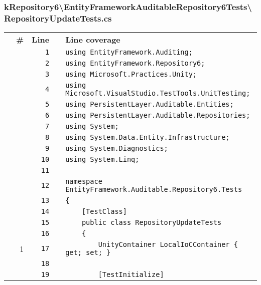 \documentclass[a4paper,10pt]{article}
\begin{document}
\subsubsection{kRepository6\textbackslash EntityFrameworkAuditableRepository6Tests\textbackslash RepositoryUpdateTests.cs}
\begin{longtable}[l]{lrrll}
\textbf{} & \textbf{\#} & \textbf{Line} & \textbf{} & \textbf{Line coverage}\\
\cellcolor{gray} &  & \verb~1~ & & \verb~using EntityFramework.Auditing;~\\
\cellcolor{gray} &  & \verb~2~ & & \verb~using EntityFramework.Repository6;~\\
\cellcolor{gray} &  & \verb~3~ & & \verb~using Microsoft.Practices.Unity;~\\
\cellcolor{gray} &  & \verb~4~ & & \verb~using Microsoft.VisualStudio.TestTools.UnitTesting;~\\
\cellcolor{gray} &  & \verb~5~ & & \verb~using PersistentLayer.Auditable.Entities;~\\
\cellcolor{gray} &  & \verb~6~ & & \verb~using PersistentLayer.Auditable.Repositories;~\\
\cellcolor{gray} &  & \verb~7~ & & \verb~using System;~\\
\cellcolor{gray} &  & \verb~8~ & & \verb~using System.Data.Entity.Infrastructure;~\\
\cellcolor{gray} &  & \verb~9~ & & \verb~using System.Diagnostics;~\\
\cellcolor{gray} &  & \verb~10~ & & \verb~using System.Linq;~\\
\cellcolor{gray} &  & \verb~11~ & & \verb~~\\
\cellcolor{gray} &  & \verb~12~ & & \verb~namespace EntityFramework.Auditable.Repository6.Tests~\\
\cellcolor{gray} &  & \verb~13~ & & \verb~{~\\
\cellcolor{gray} &  & \verb~14~ & & \verb~    [TestClass]~\\
\cellcolor{gray} &  & \verb~15~ & & \verb~    public class RepositoryUpdateTests~\\
\cellcolor{gray} &  & \verb~16~ & & \verb~    {~\\
\cellcolor{green} & 1 & \verb~17~ & & \verb~        UnityContainer LocalIoCContainer { get; set; }~\\
\cellcolor{gray} &  & \verb~18~ & & \verb~~\\
\cellcolor{gray} &  & \verb~19~ & & \verb~        [TestInitialize]~\\

\end{longtable}
\end{document}
